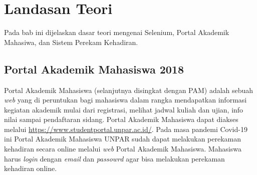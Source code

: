 \chapter{Landasan Teori}
\label{chap:teori}
Pada bab ini dijelaskan dasar teori mengenai Selenium, Portal Akademik Mahasiwa, dan Sistem Perekam Kehadiran. 

\section{Portal Akademik Mahasiswa 2018}
\label{sec:pam} 
Portal Akademik Mahasiswa (selanjutnya disingkat dengan PAM) adalah sebuah \textit{web} yang di peruntukan bagi mahasiswa dalam rangka mendapatkan informasi kegiatan akademik mulai dari registrasi, melihat jadwal kuliah dan ujian, info nilai sampai pendaftaran sidang\cite{portalunpar}. Portal Akademik Mahasiswa dapat diakses melalui \url{https://www.studentportal.unpar.ac.id/}. Pada masa pandemi Covid-19 ini Portal Akademik Mahasiswa UNPAR sudah dapat melakukan perekaman kehadiran secara online melalui \textit{web} Portal Akademik Mahasiswa. Mahasiswa harus \textit{login} dengan \textit{email} dan \textit{passowrd} agar bisa melakukan perekaman kehadiran online.

